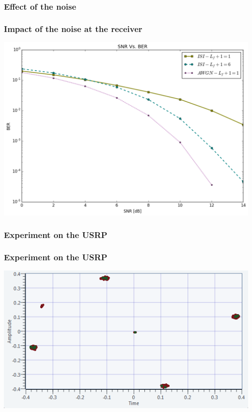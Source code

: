 \documentclass[11pt]{beamer}
\begin{document}
\subsubsection{Effect of the noise}
\begin{frame}
\frametitle{Impact of the noise at the receiver}
\includegraphics[width=.9\linewidth]{img/SNR}
\end{frame}
\subsubsection{Experiment on the USRP}
\begin{frame}
\frametitle{Experiment on the USRP}
\includegraphics[width=.9\linewidth]{img/USRP-Rotate}
\end{frame}
\end{document}
